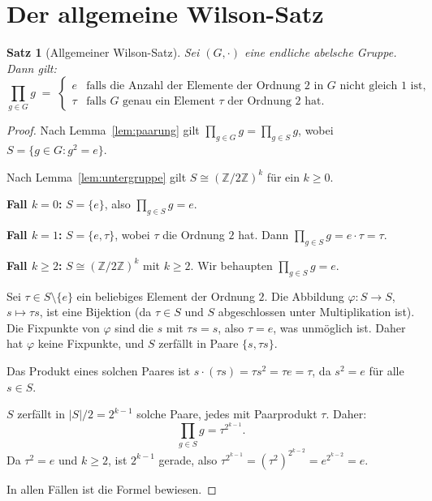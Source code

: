 \documentclass[12pt,a4paper]{amsart}
\newtheorem{theorem}{Satz}[section]
\theoremstyle{definition}
\newcommand{\Z}{\mathbb{Z}}
\begin{document}
\section{Der allgemeine Wilson-Satz}

\begin{theorem}[Allgemeiner Wilson-Satz]\label{satz:allgemeiner_wilson}
  Sei $(G, \cdot)$ eine endliche abelsche Gruppe. Dann gilt:
  \[
    \prod_{g \in G} g
    \;=\;
    \begin{cases}
      e   & \text{falls die Anzahl der Elemente der Ordnung } 2 \text{ in } G
             \text{ nicht gleich } 1 \text{ ist}, \\
      \tau & \text{falls } G \text{ genau ein Element } \tau \text{ der Ordnung } 2 \text{ hat.}
    \end{cases}
  \]
\end{theorem}

\begin{proof}
  Nach Lemma~\ref{lem:paarung} gilt $\prod_{g \in G} g = \prod_{g \in S} g$,
  wobei $S = \{g \in G : g^2 = e\}$.

  Nach Lemma~\ref{lem:untergruppe} gilt $S \cong (\Z/2\Z)^k$ für ein $k \geq 0$.

  \textbf{Fall $k = 0$:} $S = \{e\}$, also $\prod_{g \in S} g = e$.

  \textbf{Fall $k = 1$:} $S = \{e, \tau\}$, wobei $\tau$ die Ordnung $2$ hat.
  Dann $\prod_{g \in S} g = e \cdot \tau = \tau$.

  \textbf{Fall $k \geq 2$:} $S \cong (\Z/2\Z)^k$ mit $k \geq 2$.
  Wir behaupten $\prod_{g \in S} g = e$.

  Sei $\tau \in S \setminus \{e\}$ ein beliebiges Element der Ordnung $2$.
  Die Abbildung $\varphi: S \to S$, $s \mapsto \tau s$, ist eine Bijektion
  (da $\tau \in S$ und $S$ abgeschlossen unter Multiplikation ist).
  Die Fixpunkte von $\varphi$ sind die $s$ mit $\tau s = s$, also $\tau = e$,
  was unmöglich ist. Daher hat $\varphi$ keine Fixpunkte, und $S$ zerfällt in
  Paare $\{s, \tau s\}$.

  Das Produkt eines solchen Paares ist $s \cdot (\tau s) = \tau s^2 = \tau e = \tau$,
  da $s^2 = e$ für alle $s \in S$.

  $S$ zerfällt in $|S|/2 = 2^{k-1}$ solche Paare, jedes mit Paarprodukt $\tau$.
  Daher:
  \[
    \prod_{g \in S} g = \tau^{2^{k-1}}.
  \]
  Da $\tau^2 = e$ und $k \geq 2$, ist $2^{k-1}$ gerade, also
  $\tau^{2^{k-1}} = (\tau^2)^{2^{k-2}} = e^{2^{k-2}} = e$.

  In allen Fällen ist die Formel bewiesen. \qedhere
\end{proof}
\end{document}
